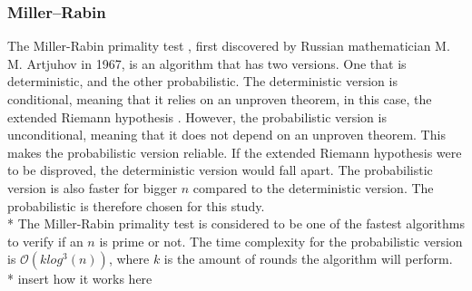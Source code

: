 \documentclass[main.tex]{subfiles}
\begin{document}
\subsubsection{Miller–Rabin}
The Miller-Rabin primality test \cite{algh:miller}, first discovered by Russian
mathematician M. M. Artjuhov in 1967, is an algorithm that has two versions. One
that is deterministic, and the other probabilistic. The deterministic version is
conditional, meaning that it relies on an unproven theorem, in this case, the
extended Riemann hypothesis \cite{riemann}. However, the probabilistic version
is unconditional, meaning that it does not depend on an unproven theorem. This
makes the probabilistic version reliable. If the extended Riemann hypothesis
were to be disproved, the deterministic version would fall apart. The
probabilistic version is also faster for bigger $n$ compared to the
deterministic version. The probabilistic is therefore chosen for this study.
\newline
\\*
The Miller-Rabin primality test is considered to be one of the fastest
algorithms to verify if an $n$ is prime or not. The time complexity for the
probabilistic version is $\mathcal{O}(k log^{3}(n))$, where $k$ is the amount of rounds
the algorithm will perform. \newline
\\*
insert how it works here
\end{document}
